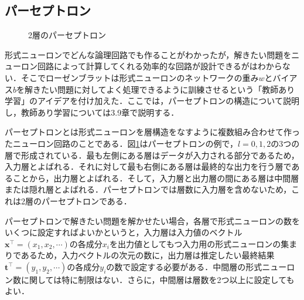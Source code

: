 \documentclass[a4paper,11pt]{jsreport}
\begin{document}
\subsection{パーセプトロン}
\begin{figure}[H]
  \begin{center}
    \centering
    \caption{2層のパーセプトロン}
    \label{2層パーセプトロン}
  \end{center}
\end{figure}
形式ニューロンでどんな論理回路でも作ることがわかったが，解きたい問題をニューロン回路によって計算してくれる効率的な回路が設計できるがはわからない．そこでローゼンブラットは形式ニューロンのネットワークの重み$w$とバイアス$b$を解きたい問題に対してよく処理できるように訓練させるという「教師あり学習」のアイデアを付け加えた\cite{Sanger1958ThePA}．ここでは，パーセプトロンの構造について説明し，教師あり学習については3.9章で説明する．\par
パーセプトロンとは形式ニューロンを層構造をなすように複数組み合わせて作ったニューロン回路のことである．図\ref{2層パーセプトロン}はパーセプトロンの例で，$l=0,1,2$の3つの層で形成されている．最も左側にある層はデータが入力される部分であるため，入力層とよばれる．それに対して最も右側にある層は最終的な出力を行う層であることから，出力層とよばれる．そして，入力層と出力層の間にある層は中間層または隠れ層とよばれる．パーセプトロンでは層数に入力層を含めないため，これは2層のパーセプトロンである．\par
パーセプトロンで解きたい問題を解かせたい場合，各層で形式ニューロンの数をいくつに設定すればよいかというと，入力層は入力値のベクトル$\bm{x}^{\top}=(x_1, x_2, \cdots)$の各成分$x_i$を出力値としてもつ入力用の形式ニューロンの集まりであるため，入力ベクトルの次元の数に，出力層は推定したい最終結果$\bm{t}^{\top}=(y_1, y_2, \cdots)$の各成分$y_i$の数で設定する必要がある．中間層の形式ニューロン数に関しては特に制限はない．さらに，中間層は層数を2つ以上に設定してもよい．
\end{document}
